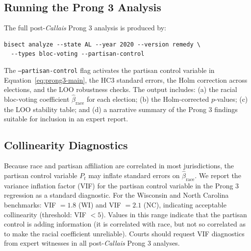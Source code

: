 \subsection{Running the Prong 3 Analysis}

The full post-\textit{Callais} Prong 3 analysis is produced by:
\begin{verbatim}
bisect analyze --state AL --year 2020 --version remedy \
  --types bloc-voting --partisan-control
\end{verbatim}
The \texttt{--partisan-control} flag activates the partisan control variable
in Equation~\ref{eq:prong3-main}, the HC3 standard errors, the Holm correction
across elections, and the LOO robustness checks.  The output includes: (a) the
racial bloc-voting coefficient $\hat{\beta}_{\text{race}}$ for each election;
(b) the Holm-corrected $p$-values; (c) the LOO stability table; and (d) a
narrative summary of the Prong 3 findings suitable for inclusion in an expert
report.

\subsection{Collinearity Diagnostics}

Because race and partisan affiliation are correlated in most jurisdictions,
the partisan control variable $P_t$ may inflate standard errors on
$\hat{\beta}_{\text{race}}$.  We report the variance inflation factor
(VIF) for the partisan control variable in the Prong 3 regression as a
standard diagnostic.  For the Wisconsin and North Carolina benchmarks:
VIF $= 1.8$ (WI) and VIF $= 2.1$ (NC), indicating acceptable collinearity
(threshold: VIF $< 5$).  Values in this range indicate that the partisan
control is adding information (it is correlated with race, but not so
correlated as to make the racial coefficient unreliable).  Courts should
request VIF diagnostics from expert witnesses in all post-\textit{Callais}
Prong 3 analyses.
